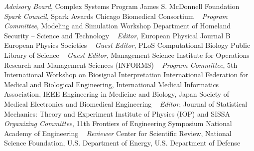 \textit{Advisory Board}, Complex Systems Program\newline
James S. McDonnell Foundation \newline
~
\Gap
{}
\textit{Spark Council}, Spark Awards\newline
Chicago Biomedical Consortium \newline
~
\Gap
{}
\textit{Program Committee}, Modeling and Simulation Workshop\newline
Department of Homeland Security -- Science and Technology \newline
~
\Gap
{}
\textit{Editor}, European Physical Journal B\newline
European Physics Societies \newline
~
\Gap
{}
\textit{Guest Editor}, PLoS Computational Biology\newline
Public Library of Science \newline
~
\Gap
{}
\textit{Guest Editor}, Management Science\newline
Institute for Operations Research and Management Sciences (INFORMS) \newline
~
\Gap
{}
\textit{Program Committee}, 5th International Workshop on Biosignal Interpretation\newline
International Federation for Medical and Biological Engineering, International Medical Informatics Association, IEEE Engineering in Medicine and Biology, Japan Society of Medical Electronics and Biomedical Engineering \newline
~
\Gap
{}
\textit{Editor}, Journal of Statistical Mechanics: Theory and Experiment\newline
Institute of Physics (IOP) and SISSA \newline
~
\Gap
{}
\textit{Organizing Committee}, 11th Frontiers of Engineering Symposium\newline
National Academy of Engineering \newline
~
\Gap
{}
\textit{Reviewer}
Center for Scientific Review, National Science Foundation, U.S. Department of Energy, U.S. Department of Defense \newline
~
\Gap
{}
